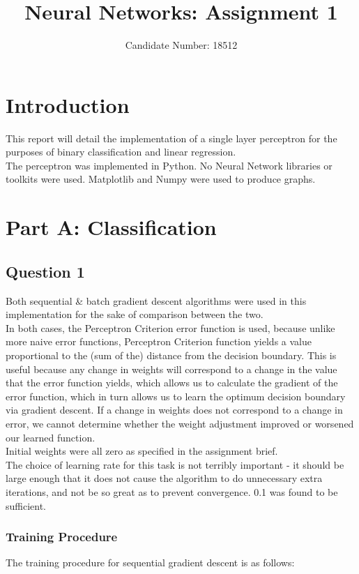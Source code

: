 \documentclass{article}
\title{Neural Networks: Assignment 1}
\author{Candidate Number: 18512}
\begin{document}
\maketitle

\section*{Introduction}
This report will detail the implementation of a single layer perceptron for the purposes of binary classification and linear regression. \\
\indent The perceptron was implemented in Python. No Neural Network libraries or toolkits were used. Matplotlib and Numpy were used to produce graphs.

\section*{Part A: Classification}
\subsection*{Question 1}
Both sequential \& batch gradient descent algorithms were used in this implementation for the sake of comparison between the two. \\
In both cases, the Perceptron Criterion error function is used, because unlike more naive error functions, Perceptron Criterion function yields a value proportional to the (sum of the) distance from the decision boundary. This is useful because any change in weights will correspond to a change in the value that the error function yields, which allows us to calculate the gradient of the error function, which in turn allows us to learn the optimum decision boundary via gradient descent. If a change in weights does not correspond to a change in error, we cannot determine whether the weight adjustment improved or worsened our learned function. \\
Initial weights were all zero as specified in the assignment brief. \\
The choice of learning rate for this task is not terribly important - it should be large enough that it does not cause the algorithm to do unnecessary extra iterations, and not be so great as to prevent convergence. 0.1 was found to be sufficient.

\subsubsection*{Training Procedure}
The training procedure for sequential gradient descent is as follows:
\end{document}
